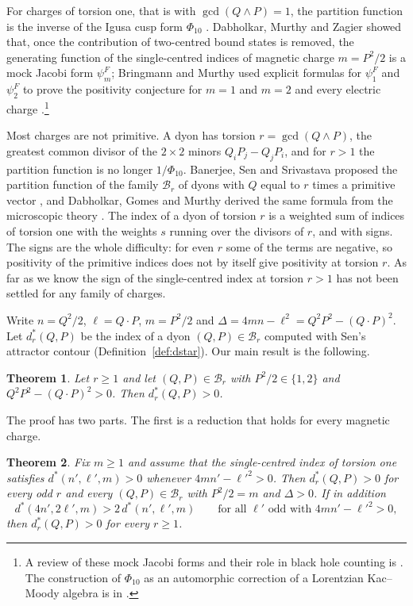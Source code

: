 \documentclass[11pt]{amsart}
\newtheorem{mainthm}{Theorem}
\theoremstyle{definition}
\newcommand{\cB}{\mathcal B}
\begin{document}
For charges of torsion one, that is with $\gcd(Q\wedge P)=1$, the partition function is the inverse of the Igusa cusp form $\Phi_{10}$ \cite{DVV97,SSY06}. Dabholkar, Murthy and Zagier showed that, once the contribution of two-centred bound states is removed, the generating function of the single-centred indices of magnetic charge $m=P^2/2$ is a mock Jacobi form $\psi^F_m$; Bringmann and Murthy used explicit formulas for $\psi^F_1$ and $\psi^F_2$ to prove the positivity conjecture for $m=1$ and $m=2$ and every electric charge \cite{BM13}.\footnote{A review of these mock Jacobi forms and their role in black hole counting is \cite{Mur25}. The construction of $\Phi_{10}$ as an automorphic correction of a Lorentzian Kac--Moody algebra is in \cite{GN97}.}

Most charges are not primitive. A dyon has torsion $r=\gcd(Q\wedge P)$, the greatest common divisor of the $2\times2$ minors $Q_iP_j-Q_jP_i$, and for $r>1$ the partition function is no longer $1/\Phi_{10}$. Banerjee, Sen and Srivastava proposed the partition function of the family $\cB_r$ of dyons with $Q$ equal to $r$ times a primitive vector \cite{BSS08a,BSS08b}, and Dabholkar, Gomes and Murthy derived the same formula from the microscopic theory \cite{DGM11}. The index of a dyon of torsion $r$ is a weighted sum of indices of torsion one with the weights $s$ running over the divisors of $r$, and with signs. The signs are the whole difficulty: for even $r$ some of the terms are negative, so positivity of the primitive indices does not by itself give positivity at torsion $r$. As far as we know the sign of the single-centred index at torsion $r>1$ has not been settled for any family of charges.

Write $n=Q^2/2$, $\ell=Q\cdot P$, $m=P^2/2$ and $\Delta=4mn-\ell^2=Q^2P^2-(Q\cdot P)^2$. Let $d^*_r(Q,P)$ be the index of a dyon $(Q,P)\in\cB_r$ computed with Sen's attractor contour (Definition~\ref{def:dstar}). Our main result is the following.

\begin{mainthm}\label{thm:A}
Let $r\ge1$ and let $(Q,P)\in\cB_r$ with $P^2/2\in\{1,2\}$ and $Q^2P^2-(Q\cdot P)^2>0$. Then $d^*_r(Q,P)>0$.
\end{mainthm}

The proof has two parts. The first is a reduction that holds for every magnetic charge.

\begin{mainthm}\label{thm:B}
Fix $m\ge1$ and assume that the single-centred index of torsion one satisfies $d^*(n',\ell',m)>0$ whenever $4mn'-\ell'^2>0$. Then $d^*_r(Q,P)>0$ for every odd $r$ and every $(Q,P)\in\cB_r$ with $P^2/2=m$ and $\Delta>0$. If in addition
\begin{equation}\label{eq:doubling}
d^*(4n',2\ell',m)>2\,d^*(n',\ell',m)\qquad\text{for all $\ell'$ odd with } 4mn'-\ell'^2>0,
\end{equation}
then $d^*_r(Q,P)>0$ for every $r\ge1$.
\end{mainthm}
\end{document}
